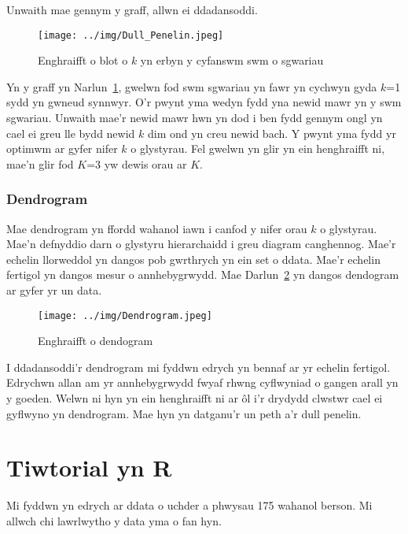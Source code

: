 Unwaith mae gennym y graff, allwn ei ddadansoddi. 

\begin{figure}[H]
\begin{center}
\texttt{[image: ../img/Dull\_Penelin.jpeg]}
\caption{Enghraifft o blot o $k$ yn erbyn y cyfanswm swm o sgwariau}
\label{fig:dullpenelin}
\end{center}
\end{figure}

Yn y graff yn Narlun~\ref{fig:dullpenelin}, gwelwn fod swm sgwariau yn fawr yn cychwyn gyda $k$=1 sydd yn gwneud synnwyr. %
O'r pwynt yma wedyn fydd yna newid mawr yn y swm sgwariau. Unwaith mae'r newid mawr hwn yn dod i ben fydd gennym ongl yn cael ei greu lle bydd newid $k$ dim ond yn creu newid bach. Y pwynt yma fydd yr optimwm ar gyfer nifer $k$ o glystyrau. Fel gwelwn yn glir yn ein henghraifft ni, mae'n glir fod $K$=3 yw dewis orau ar $K$.

\subsubsection{Dendrogram}

Mae dendrogram yn ffordd wahanol iawn i canfod y nifer orau $k$ o glystyrau. Mae'n defnyddio darn o glystyru hierarchaidd i greu diagram canghennog. Mae'r echelin llorweddol yn dangos pob gwrthrych yn ein set o ddata. Mae'r echelin fertigol yn dangos mesur o annhebygrwydd. Mae Darlun~\ref{fig:dendogram} yn dangos dendogram ar gyfer yr un data.

\begin{figure}[H]
\begin{center}
\texttt{[image: ../img/Dendrogram.jpeg]}
\end{center}
\caption{Enghraifft o dendogram}
\label{fig:dendogram}
\end{figure}

I ddadansoddi'r dendrogram mi fyddwn edrych yn bennaf ar yr echelin fertigol. Edrychwn allan am yr annhebygrwydd fwyaf rhwng cyflwyniad o gangen arall yn y goeden. Welwn ni hyn yn ein henghraifft ni ar ôl i'r drydydd clwstwr cael ei gyflwyno yn dendrogram. Mae hyn yn datganu'r un peth a'r dull penelin.

\section{Tiwtorial yn R}
Mi fyddwn yn edrych ar ddata o uchder a phwysau 175 wahanol berson. Mi allwch chi lawrlwytho y data yma o fan hyn. %

